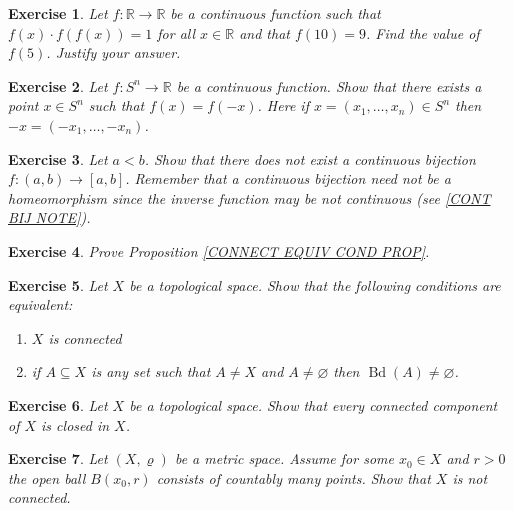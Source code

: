 \documentclass[11pt, letterpaper, oneside]{report}
\theoremstyle{pplain}
\newtheorem{ITERMVALUE THM}[theorem]{Intermediate Value Theorem}
\newtheorem{HEINEBOREL THM}[theorem]{Heine-Borel Theorem}
\newtheorem{UMETR THM}[theorem]{Urysohn Metrization Theorem}
\newtheorem{UMETR2 THM}[theorem]{Urysohn Metrization Theorem (v.2)}
\theoremstyle{ddefinition}
\theoremstyle{nnn}
\newtheorem{TDA NN}[theorem]{Topological Data Analysis. }
\theoremstyle{eexercise}
\newtheorem{exercise}{Exercise}[chapter]
\newcommand{\R}{{\mathbb R}}
\newcommand{\Bd}{\operatorname{Bd}}
\newcommand{\benu}{\begin{enumerate}}
\newcommand{\eenu}{\end{enumerate}}
\begin{document}
\begin{exercise}
Let $f\colon \R \to \R$ be a continuous function such that $f(x)\cdot f(f(x)) = 1$ for all $x\in \R$ and that 
$f(10) = 9$. Find the value of $f(5)$. Justify your answer.  
\end{exercise}




\begin{exercise}
Let $f\colon S^{n} \to \R$ be a continuous function. Show that there exists a point $x\in S^{n}$
such that $f(x) = f(-x)$. Here if $x = (x_{1}, \dots, x_{n})\in S^{n}$ then $-x = (-x_{1}, \dots, -x_{n})$. 
\end{exercise}





\begin{exercise}
Let $a< b$. Show that there does not exist a continuous bijection $f\colon (a, b) \to [a, b]$. 
Remember  that a continuous bijection need not be a homeomorphism since the inverse function 
may be not continuous (see \ref{CONT BIJ NOTE}).
\end{exercise}




\begin{exercise}
Prove Proposition \ref{CONNECT EQUIV COND PROP}. 
\end{exercise}




\begin{exercise}
Let $X$ be a topological space. Show that the following conditions are equivalent:
\benu
\item $X$ is connected 
\item if $A\subseteq X$ is any set such that $A\neq X$ and $A\neq \varnothing$ then $\Bd(A)\neq \varnothing$. 
\eenu
\end{exercise}





\begin{exercise}
Let $X$ be a topological space. Show that every connected component of $X$ is closed in $X$.  
\end{exercise}



\begin{exercise}
Let $(X, \varrho)$ be a metric space. Assume for some $x_{0}\in X$ and $r>0$ the open ball $B(x_{0}, r)$
consists of countably many points. Show that $X$ is not connected. 
\end{exercise}
\end{document}
